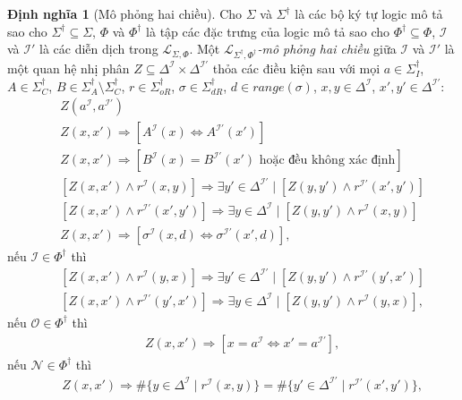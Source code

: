 \documentclass[12pt,a4paper,twoside]{report}
\newcommand{\mL}		{\mathcal{L}}
\newcommand{\mI}		{\mathcal{I}}
\newcommand{\mO}		{\mathcal{O}}
\newcommand{\mN}		{\mathcal{N}}
\newcommand{\SigmaDag}	{\Sigma^\dag}
\newcommand{\SigmaDagI}	{\Sigma^\dag_I}
\newcommand{\SigmaDagA}	{\Sigma^\dag_A}
\newcommand{\SigmaDagC}	{\Sigma^\dag_C}
\newcommand{\SigmaDagOR}{\Sigma^\dag_{oR}}
\newcommand{\SigmaDagDR}{\Sigma^\dag_{dR}}
\newcommand{\PhiDag}	{\Phi^\dag}
\newcommand{\mLSP}		{\mL_{\Sigma,\Phi}}
\newcommand{\mLSPD}		{\mL_{\Sigma^\dag,\Phi^\dag}}
\newcommand{\E}			{\exists}
\newcommand{\Range}		{\mathit{range}}
\theoremstyle{definition}
\newtheorem{Definition}{Định nghĩa}[chapter]
\begin{document}
\begin{Definition}[Mô phỏng hai chiều]
\label{def:Bisimulation}
\allowdisplaybreaks
Cho $\Sigma$ và $\SigmaDag$ là các bộ ký tự logic mô tả sao cho $\SigmaDag \subseteq \Sigma$, $\Phi$ và $\PhiDag$ là tập các đặc trưng của logic mô tả sao cho $\PhiDag \subseteq \Phi$, $\mI$ và $\mI'$ là các diễn dịch trong $\mLSP$.
%
Một {\em $\mLSPD$-mô phỏng hai chiều} giữa $\mI$ và $\mI'$ là một quan hệ nhị phân $Z \subseteq \Delta^\mI \times \Delta^{\mI'}$ thỏa các điều kiện sau với mọi $a \in \SigmaDagI$, $A \in \SigmaDagC$, $B \in \SigmaDagA\setminus\SigmaDagC$, $r \in \SigmaDagOR$, $\sigma \in \SigmaDagDR$, $d \in \Range(\sigma)$, $x,y \in \Delta^\mI$, $x',y' \in \Delta^{\mI'}$:
\begin{eqnarray}
&&\!\!\!\!\!\!\!\!
Z(a^\mI,a^{\mI'}) \label{bs:eqA} \\
&&\!\!\!\!\!\!\!\!
Z(x,x') \Rightarrow [A^\mI(x) \Leftrightarrow A^{\mI'}(x')] \label{bs:eqB1} \\
&&\!\!\!\!\!\!\!\!
Z(x,x') \Rightarrow [B^\mI(x) = B^{\mI'}(x') \textrm{ hoặc đều không xác định}] \label{bs:eqB2} \\
&&\!\!\!\!\!\!\!\!
[Z(x,x') \wedge r^\mI(x,y)] \Rightarrow \E y' \in \Delta^{\mI'} \mid [Z(y,y') \wedge r^{\mI'}(x',y')] \label{bs:eqC1} \\
&&\!\!\!\!\!\!\!\!
[Z(x,x') \wedge r^{\mI'}(x',y')] \Rightarrow \E y \in \Delta^\mI \mid [Z(y,y') \wedge r^\mI(x,y)] \label{bs:eqC2} \\
&&\!\!\!\!\!\!\!\!
Z(x,x') \Rightarrow [\sigma^\mI(x,d) \Leftrightarrow \sigma^{\mI'}(x',d)], \label{bs:eqD}
\end{eqnarray}
%
nếu $\mI \in \Phi^\dag$ thì
\begin{eqnarray}
&&\!\!\!\!\!\!\!\!
[Z(x,x') \wedge r^\mI(y,x)] \Rightarrow \E y' \in \Delta^{\mI'} \mid [Z(y,y') \wedge r^{\mI'}(y',x')] \label{bs:eqI1} \\
&&\!\!\!\!\!\!\!\!
[Z(x,x') \wedge r^{\mI'}(y',x')] \Rightarrow \E y \in \Delta^\mI \mid [Z(y,y') \wedge r^\mI(y,x)], \label{bs:eqI2}
\end{eqnarray}
%
nếu $\mO \in \Phi^\dag$ thì
\begin{eqnarray}
&& Z(x,x') \Rightarrow [x = a^\mI \Leftrightarrow x' = a^{\mI'}], \label{bs:eqO0}
\end{eqnarray}
%
nếu $\mN \in \Phi^\dag$ thì
\begin{eqnarray}
&&
Z(x,x') \Rightarrow \#\{y \in \Delta^\mI \mid r^\mI(x,y)\} = \#\{y' \in \Delta^{\mI'} \mid r^{\mI'}(x',y')\}, \label{bs:eqN}
\end{eqnarray}

\end{Definition}
\end{document}
